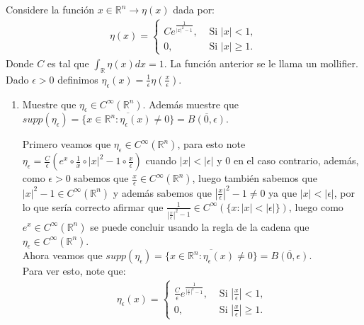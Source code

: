 \begin{homeworkProblem}
  Considere la función $x\in\mathbb{R}^{n}\rightarrow \eta(x)$ dada por:
  \begin{align*}
    \eta(x)= 
    \begin{cases}
      Ce^{\frac{1}{|x|^2-1}}, &\text{ Si } |x|<1,\\
      0, &\text{ Si } |x|\geq 1.
    \end{cases}
  \end{align*}
  Donde $C$ es tal que $\int_{\mathbb{R}}\eta(x)dx=1$. La función anterior se le llama un mollifier. Dado $\epsilon>0$ definimos $\eta_{\epsilon}(x)=\frac{1}{\epsilon}\eta(\frac{x}{\epsilon})$.
  \begin{enumerate}
    \item Muestre que $\eta_{\epsilon}\in C^{\infty}(\mathbb{R}^{n})$. Además muestre que $supp(\eta_{\epsilon})=\overline{\{x\in\mathbb{R}^{n}:\eta_{\epsilon}(x)\neq 0\}}=\overline{B(0,\epsilon)}$.
      \begin{solucion}
        Primero veamos que $\eta_{\epsilon}\in C^{\infty}(\mathbb{R}^{n})$, para esto note $\eta_{\epsilon}=\frac{C}{\epsilon}(e^{x}\circ \frac{1}{x} \circ |x|^2-1 \circ \frac{x}{\epsilon})$ cuando $|x|<|\epsilon|$ y $0$ en el caso contrario, además, como $\epsilon>0$ sabemos que $\frac{x}{\epsilon}\in C^{\infty}(\mathbb{R}^{n})$, luego también sabemos que $|x|^2-1\in C^{\infty}(\mathbb{R}^{n})$ y además sabemos que $\left|\frac{x}{\epsilon}\right|^2-1\neq 0$ ya que $|x|<|\epsilon|$, por lo que sería correcto afirmar que $\frac{1}{\left| \frac{x}{\epsilon} \right|^2-1}\in C^{\infty}(\{x:|x|<|\epsilon|\})$, luego como $e^{x}\in C^{\infty}(\mathbb{R}^{n})$ se puede concluir usando la regla de la cadena que $ \eta_{\epsilon} \in C^{\infty}(\mathbb{R}^{n})$.\\
        Ahora veamos que $supp(\eta_{\epsilon})=\overline{\{x\in\mathbb{R}^{n}:\eta_{\epsilon}(x)\neq 0\}}=\overline{B(0,\epsilon)}$.\\
        Para ver esto, note que:
        \begin{align*}
          \eta_{\epsilon}(x)= 
          \begin{cases}
            \frac{C}{\epsilon}e^{\frac{1}{\left| \frac{x}{\epsilon} \right|^2-1}}, &\text{ Si } \left| \frac{x}{\epsilon} \right|< 1,\\
            0, &\text{ Si } \left| \frac{x}{\epsilon} \right|\geq 1.
          \end{cases}
        \end{align*}

\end{solucion}
\end{enumerate}
\end{homeworkProblem}
